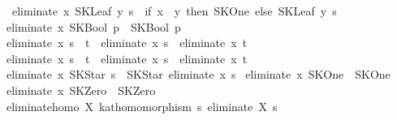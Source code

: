\begin{isabellebody}
\ \ {}eliminate\ x\ {}SKLeaf\ y\ s{}\ {}\ {}if\ x\ {}\ y\ then\ SKOne\ else\ {}SKLeaf\ y\ s{}{}{}\isanewline
{}\ {}eliminate\ x\ {}SKBool\ p{}\ {}\ {}SKBool\ p{}{}\isanewline
{}\ {}eliminate\ x\ {}s\ {}{}{}\ t{}\ {}\ eliminate\ x\ s\ {}{}{}\ eliminate\ x\ t{}\isanewline
{}\ {}eliminate\ x\ {}s\ {}{}{}\ t{}\ {}\ eliminate\ x\ s\ {}{}{}\ eliminate\ x\ t{}\isanewline
{}\ {}eliminate\ x\ {}SKStar\ s{}\ {}\ SKStar\ {}eliminate\ x\ s{}{}\isanewline
{}\ {}eliminate\ x\ SKOne\ {}\ SKOne{}\isanewline
{}\ {}eliminate\ x\ SKZero\ {}\ SKZero{}\isanewline
\isanewline
{}\isamarkupfalse%
\ eliminate{}homo{}\ {}{}X{}\ kat{}homomorphism\ {}{}s{}\ {}eliminate\ X\ s{}{}{}\isanewline

\end{isabellebody}
